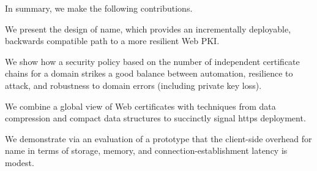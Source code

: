 In summary, we make the following contributions.
\begin{compactitem}
\item We present the design of \ac{name}, which provides an incrementally deployable,
      backwards compatible path to a more resilient Web PKI.
\item We show how a security policy based on the number of independent certificate chains
      for a domain strikes a good balance between automation, 
      resilience to attack, and robustness to domain errors (including private key loss).
\item We combine a global view of Web certificates with techniques from data
      compression and compact data structures to succinctly signal \ac{https}
      deployment.
\item We demonstrate via an evaluation of a prototype that the client-side overhead for
      \ac{name} in terms of storage, memory, and connection-establishment latency is
      modest. 
\end{compactitem}

